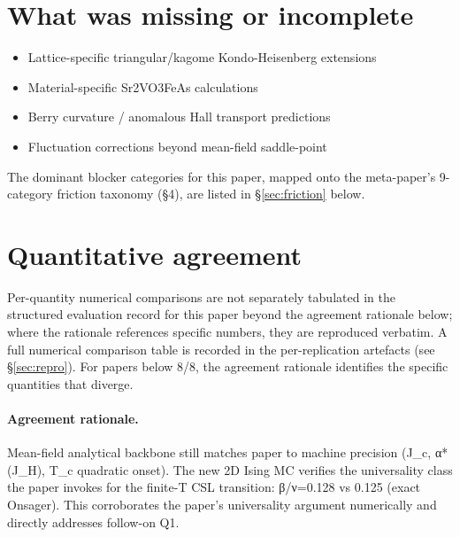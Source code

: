 \documentclass[11pt]{article}
\begin{document}
\section{What was missing or incomplete}
\begin{itemize}
\item Lattice-specific triangular/kagome Kondo-Heisenberg extensions
\item Material-specific Sr2VO3FeAs calculations
\item Berry curvature / anomalous Hall transport predictions
\item Fluctuation corrections beyond mean-field saddle-point
\end{itemize}
The dominant blocker categories for this paper, mapped onto the meta-paper's 9-category friction taxonomy (\S4), are listed in \S\ref{sec:friction} below.

\section{Quantitative agreement}
Per-quantity numerical comparisons are not separately tabulated in the structured evaluation record for this paper beyond the agreement rationale below; where the rationale references specific numbers, they are reproduced verbatim. A full numerical comparison table is recorded in the per-replication artefacts (see \S\ref{sec:repro}). For papers below 8/8, the agreement rationale identifies the specific quantities that diverge.

\paragraph{Agreement rationale.} Mean-field analytical backbone still matches paper to machine precision (J\_c, α*(J\_H), T\_c quadratic onset). The new 2D Ising MC verifies the universality class the paper invokes for the finite-T CSL transition: β/ν=0.128 vs 0.125 (exact Onsager). This corroborates the paper's universality argument numerically and directly addresses follow-on Q1.
\end{document}
